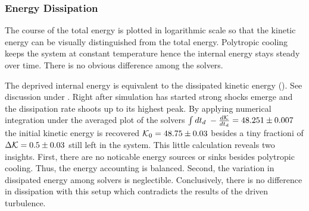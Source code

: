 
\subsubsection{Energy Dissipation}
\label{sec:decayturb-ekin-diss}
The course of the total energy  is plotted in
logarithmic scale so that the kinetic energy can be visually distinguished from
the total energy. Polytropic cooling keeps the system at constant temperature
hence the internal energy stays steady over time. There is no obvious 
difference among the solvers.


The deprived internal energy is equivalent to the dissipated kinetic energy
(). See discussion under
. Right after simulation has started
strong shocks emerge and the dissipation rate shoots up to its highest peak.
By applying numerical integration under the averaged plot of the solvers $\int
dt_d \; -\frac{d\mathcal{K}}{dt_d} = 48.251 \pm 0.007$  the initial kinetic energy is
recovered $\mathcal{K}_0 = 48.75 \pm 0.03$ besides a tiny fractioni of $\Delta \mathcal{K}
= 0.5 \pm 0.03$ still left in the system. This little calculation reveals two
insights. First, there are no noticable energy sources or sinks besides
polytropic cooling. Thus, the energy accounting is balanced. Second, the
variation in dissipated energy among solvers is neglectible. Conclusively,
there is no difference in dissipation with this setup which contradicts 
the results of the driven turbulence.

